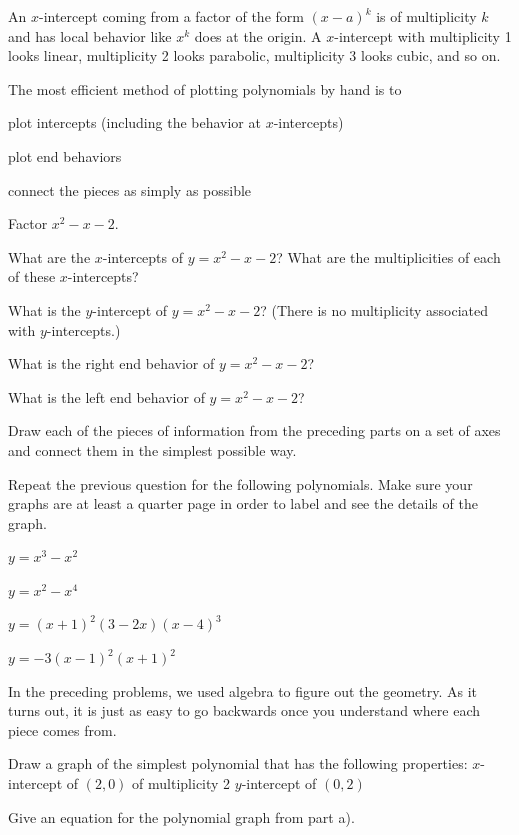 \begin{info}
An $x$-intercept coming from a factor of the form $(x-a)^k$ is of multiplicity $k$ and has local behavior like $x^k$ does at the origin. A $x$-intercept with multiplicity 1 looks linear, multiplicity 2 looks parabolic, multiplicity 3 looks cubic, and so on.

The most efficient method of plotting polynomials by hand is to
\be
\item plot intercepts (including the behavior at $x$-intercepts)
\item plot end behaviors
\item connect the pieces as simply as possible
\ee
\end{info}

\bq
\be
\item Factor $x^2-x-2$.
\item What are the $x$-intercepts of $y=x^2-x-2$? What are the multiplicities of each of these $x$-intercepts?
\item What is the $y$-intercept of $y=x^2-x-2$? (There is no multiplicity associated with $y$-intercepts.)
\item What is the right end behavior of $y=x^2-x-2$?
\item What is the left end behavior of $y=x^2-x-2$?
\item Draw each of the pieces of information from the preceding parts on a set of axes and connect them in the simplest possible way.
\ee
\eq


\bq Repeat the previous question for the following polynomials. Make sure your graphs are at least a quarter page in order to label and see the details of the graph.
\be
\item $y=x^3-x^2$
\item $y=x^2-x^4$
\item $y=(x+1)^2(3-2x)(x-4)^3$
\item $y=-3(x-1)^2(x+1)^2$
\ee
\eq

In the preceding problems, we used algebra to figure out the geometry. As it turns out, it is just as easy to go backwards once you understand where each piece comes from.
\bq
\be
\item Draw a graph of the simplest polynomial that has the following properties:
\subitem $x$-intercept of $(2,0)$ of multiplicity 2
\subitem $y$-intercept of $(0,2)$
\item Give an equation for the polynomial graph from part a).
\ee
\eq

